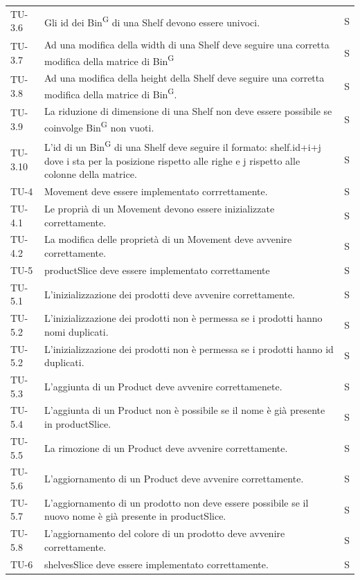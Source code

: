 \begin{xltabular}{0.9\textwidth}{X | p{0.6\textwidth} | p{0.1\textwidth} }
    TU-3.6 & Gli id dei Bin\textsuperscript{G} di una Shelf devono essere univoci. & S\\
    TU-3.7 & Ad una modifica della width di una Shelf deve seguire una corretta modifica della matrice di Bin\textsuperscript{G} & S\\
    TU-3.8 & Ad una modifica della height della Shelf deve seguire una corretta modifica della matrice di Bin\textsuperscript{G}. & S\\
    TU-3.9 & La riduzione di dimensione di una Shelf non deve essere possibile se coinvolge Bin\textsuperscript{G} non vuoti. & S\\
    TU-3.10 & L'id di un Bin\textsuperscript{G} di una Shelf deve seguire il formato: shelf.id+i+j dove i sta per la posizione rispetto alle righe e j rispetto alle colonne della matrice.  & S\\
    TU-4 & Movement deve essere implementato corrrettamente. & S\\
    TU-4.1 & Le proprià di un Movement devono essere inizializzate correttamente. & S\\
    TU-4.2 & La modifica delle proprietà di un Movement deve avvenire correttamente. & S\\
    TU-5 & productSlice deve essere implementato correttamente & S\\
    TU-5.1 & L'inizializzazione dei prodotti deve avvenire correttamente. & S\\
    TU-5.2 & L'inizializzazione dei prodotti non è permessa se i prodotti hanno nomi duplicati. & S\\
    TU-5.2 & L'inizializzazione dei prodotti non è permessa se i prodotti hanno id duplicati. & S\\
    TU-5.3 & L'aggiunta di un Product deve avvenire correttamenete. & S\\
    TU-5.4 & L'aggiunta di un Product non è possibile se il nome è già presente in productSlice. & S\\
    TU-5.5 & La rimozione di un Product deve avvenire correttamente. & S\\
    TU-5.6 & L'aggiornamento di un Product deve avvenire correttamente. & S\\
    TU-5.7 & L'aggiornamento di un prodotto non deve essere possibile se il nuovo nome è già presente in productSlice. & S\\
    TU-5.8 & L'aggiornamento del colore di un prodotto deve avvenire correttamente. & S\\ 
    TU-6 & shelvesSlice deve essere implementato correttamente. & S\\

\end{xltabular}
